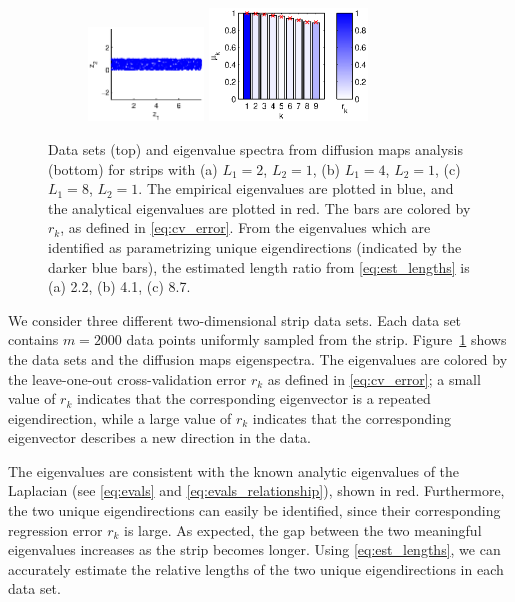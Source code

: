 \documentclass[3p]{elsarticle}
\begin{document}
\begin{figure}[!t]
\begin{subfigure}{0.25\textwidth}
\end{subfigure}
%
%
\begin{subfigure}{0.3\textwidth}
\includegraphics[height=2.5cm]{strip_data_L8}
\includegraphics[height=3cm]{strip_spectrum_L8}
\caption{}
\end{subfigure}
%
\caption{Data sets (top) and eigenvalue spectra from diffusion maps analysis (bottom) for strips with (a) $L_1 = 2$, $L_2 = 1$, (b) $L_1 = 4$, $L_2 = 1$, (c) $L_1 = 8$, $L_2 = 1$. The empirical eigenvalues are plotted in blue, and the analytical eigenvalues are plotted in red. The bars are colored by $r_k$, as defined in \eqref{eq:cv_error}. From the eigenvalues which are identified as parametrizing unique eigendirections (indicated by the darker blue bars), the estimated length ratio from \eqref{eq:est_lengths} is (a) 2.2, (b) 4.1, (c) 8.7.
}
\label{fig:strip_compare_analytic}
\end{figure}

We consider three different two-dimensional strip data sets.
%
Each data set contains $m=2000$ data points uniformly sampled from the strip.
%
Figure~\ref{fig:strip_compare_analytic} shows the data sets and the diffusion maps eigenspectra.
%
The eigenvalues are colored by the leave-one-out cross-validation error $r_k$ as defined in \eqref{eq:cv_error};
a small value of $r_k$ indicates that the corresponding eigenvector is a repeated eigendirection, while a
large value of $r_k$ indicates that the corresponding eigenvector describes a new direction in the data.
%

The eigenvalues are consistent with the known analytic eigenvalues of
the Laplacian (see \eqref{eq:evals} and \eqref{eq:evals_relationship}), shown in red.
%
Furthermore, the two unique eigendirections can easily be identified, since their corresponding regression error $r_k$ is large.
%
As expected, the gap between the two meaningful eigenvalues increases as the strip becomes longer.
%
Using \eqref{eq:est_lengths}, we can accurately estimate the relative lengths of the two unique eigendirections in each data set.
\end{document}
